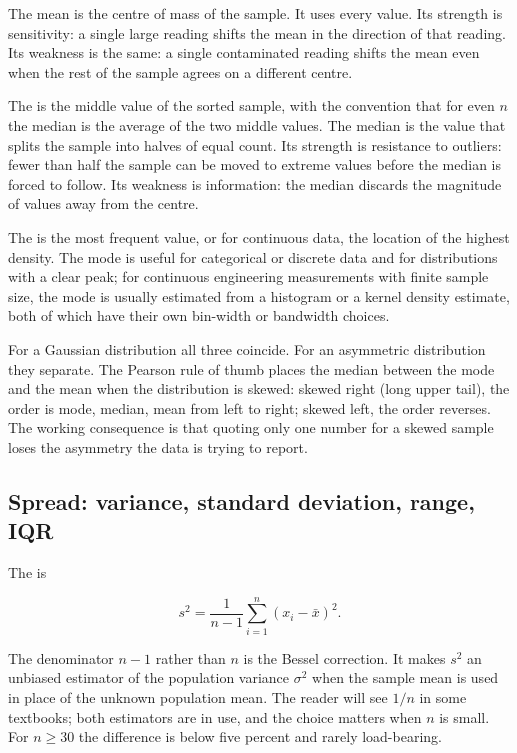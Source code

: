 The mean is the centre of mass of the sample. It uses every value.
Its strength is sensitivity: a single large reading shifts the mean
in the direction of that reading. Its weakness is the same: a single
contaminated reading shifts the mean even when the rest of the
sample agrees on a different centre.

The  is the middle value of the sorted
sample, with the convention that for even $n$ the median is the
average of the two middle values. The median is the value that
splits the sample into halves of equal count. Its strength is
resistance to outliers: fewer than half the sample can be moved to
extreme values before the median is forced to follow. Its weakness
is information: the median discards the magnitude of values away
from the centre.

The  is the most frequent value, or for
continuous data, the location of the highest density. The mode is
useful for categorical or discrete data and for distributions with a
clear peak; for continuous engineering measurements with finite
sample size, the mode is usually estimated from a histogram or a
kernel density estimate, both of which have their own bin-width or
bandwidth choices.

For a Gaussian distribution all three coincide. For an asymmetric
distribution they separate. The Pearson rule of thumb places the
median between the mode and the mean when the distribution is
skewed: skewed right (long upper tail), the order is mode, median,
mean from left to right; skewed left, the order reverses. The
working consequence is that quoting only one number for a skewed
sample loses the asymmetry the data is trying to report.

\subsection{Spread: variance, standard deviation, range, IQR}

The  is

\[
s^{2} = \frac{1}{n - 1}\sum_{i=1}^{n}(x_{i} - \bar{x})^{2}.
\]

The denominator $n - 1$ rather than $n$ is the Bessel correction. It
makes $s^{2}$ an unbiased estimator of the population variance
$\sigma^{2}$ when the sample mean is used in place of the unknown
population mean. The reader will see $1/n$ in some textbooks; both
estimators are in use, and the choice matters when $n$ is small. For
$n \geq 30$ the difference is below five percent and rarely
load-bearing.

